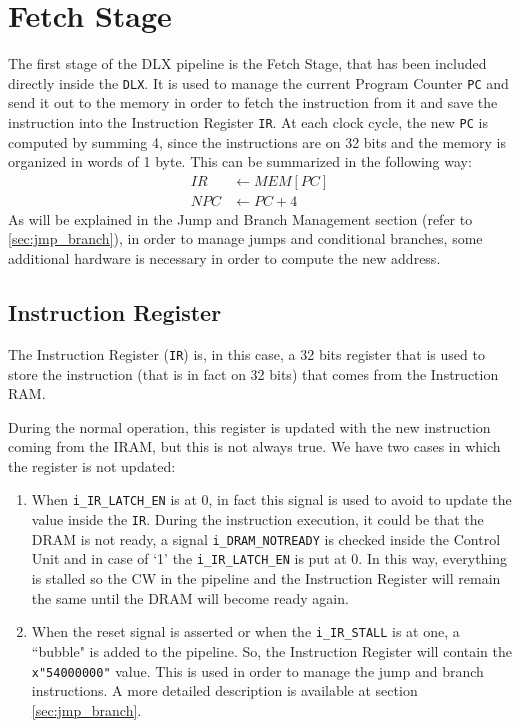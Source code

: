 \chapter{Fetch Stage}
The first stage of the DLX pipeline is the Fetch Stage, that has been included directly inside the \texttt{DLX}. It is used to manage the current Program Counter \texttt{PC} and send it out to the memory in order to fetch the instruction from it and save the instruction into the Instruction Register \texttt{IR}. At each clock cycle, the new \texttt{PC} is computed by summing 4, since the instructions are on 32 bits and the memory is organized in words of 1 byte. This can be summarized in the following way:
\begin{align*}
	IR &\leftarrow MEM[PC]\\
	NPC &\leftarrow PC + 4
\end{align*}
As will be explained in the Jump and Branch Management section (refer to \ref{sec:jmp_branch}), in order to manage jumps and conditional branches, some additional hardware is necessary in order to compute the new address.

\section{Instruction Register}
The Instruction Register (\texttt{IR}) is, in this case, a 32 bits register that is used to store the instruction (that is in fact on 32 bits) that comes from the Instruction RAM.

During the normal operation, this register is updated with the new instruction coming from the IRAM, but this is not always true. We have two cases in which the register is not updated:
\begin{enumerate}
	\item When \texttt{i\_IR\_LATCH\_EN} is at 0, in fact this signal is used to avoid to update the value inside the \texttt{IR}. During the instruction execution, it could be that the DRAM is not ready, a signal \texttt{i\_DRAM\_NOTREADY} is checked inside the Control Unit and in case of `1' the \texttt{i\_IR\_LATCH\_EN} is put at 0. In this way, everything is stalled so the CW in the pipeline and the Instruction Register will remain the same until the DRAM will become ready again. 
	\item When the reset signal is asserted or when the \texttt{i\_IR\_STALL} is at one, a ``bubble" is added to the pipeline. So, the Instruction Register will contain the \texttt{x"54000000"} value. This is used in order to manage the jump and branch instructions. A more detailed description is available at section \ref{sec:jmp_branch}.
\end{enumerate}

